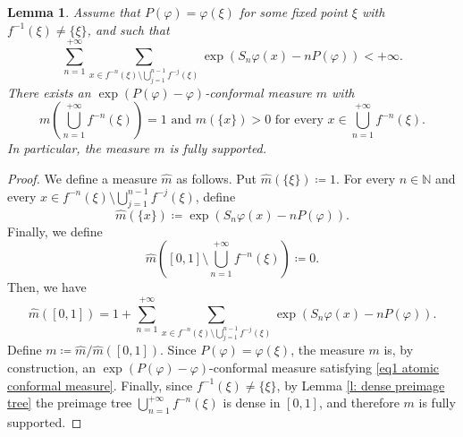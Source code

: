 \documentclass[10pt,a4paper]{amsart}
\numberwithin{equation}{section} %
\numberwithin{figure}{section} %
\newtheorem{lemm}[prop]{Lemma}
\newcommand{\N}{\mathbb{N}}
\renewcommand{\=}{\coloneqq}
\begin{document}
\begin{lemm}\label{lemma atomic conformal measure}
    Assume that $P(\varphi)= \varphi(\xi)$ for some fixed point $\xi$ with $f^{-1}(\xi) \neq \{\xi\}$, and such that
    \begin{equation}\label{eq series conformal measures}
        \sum_{n=1}^{+\infty}\sum_{x\in f^{-n}(\xi)\setminus\bigcup_{j=1}^{n-1}f^{-j}(\xi)} \exp(S_n\varphi(x) - nP(\varphi)) <+\infty.
    \end{equation}
    There exists an $\exp(P(\varphi)-\varphi)$-conformal measure $m$ with 
    \begin{equation}\label{eq1 atomic conformal measure}
        m\left(\bigcup_{n=1}^{+\infty}f^{-n}(\xi)\right) =1 \text{ and } m(\{x\})>0 \text{ for every }x \in \bigcup_{n=1}^{+\infty}f^{-n}(\xi).
    \end{equation}
    In particular, the measure $m$ is fully supported.
\end{lemm}
\begin{proof}
  We define a measure $\widehat{m}$ as follows. Put $\widehat{m}(\{\xi\})\=1$. For every $n\in \N$ and every $x\in f^{-n}(\xi)\setminus \bigcup_{j=1}^{n-1}f^{-j}(\xi)$, define
  \begin{equation}\label{eq defintion fully atomic conformal measure}
      \widehat{m}(\{x\})\= \exp(S_n\varphi(x) - nP(\varphi)).
  \end{equation}
  Finally, we define 
  \begin{equation*}
      \widehat{m}\left([0,1] \setminus \bigcup_{n=1}^{+\infty}f^{-n}(\xi)\right) \=0.
  \end{equation*}
  Then, we have
  \begin{equation*}
      \widehat{m}([0,1]) =1 +\sum_{n=1}^{+\infty}\sum_{x\in f^{-n}(\xi)\setminus\bigcup_{j=1}^{n-1}f^{-j}(\xi)} \exp(S_n\varphi(x) - nP(\varphi)). 
  \end{equation*}
  Define $m\= \widehat{m}/\widehat{m}([0,1])$. Since $P(\varphi)=\varphi(\xi)$, the measure $m$ is, by construction, an $\exp(P(\varphi)-\varphi)$-conformal measure satisfying \eqref{eq1 atomic conformal measure}. Finally, since $f^{-1}(\xi)\neq \{\xi\}$, by Lemma \ref{l: dense preimage tree} the preimage tree $\bigcup_{n=1}^{+\infty}f^{-n}(\xi)$ is dense in $[0,1]$, and therefore $m$ is fully supported.
\end{proof}
\end{document}
